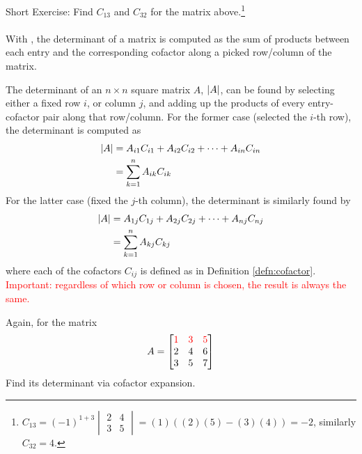 Short Exercise: Find $C_{13}$ and $C_{32}$ for the matrix above.\footnote{$C_{13} = (-1)^{1+3}\begin{vmatrix}
2 & 4 \\
3 & 5
\end{vmatrix} = (1)((2)(5)-(3)(4)) = -2$, similarly $C_{32} = 4$.}\\
\\
With , the determinant of a matrix is computed as the sum of products between each entry and the corresponding cofactor along a picked row/column of the matrix.
\begin{proper}
\label{proper:cofactorex}
The determinant of an $n \times n$ square matrix $A$, $\abs{A}$, can be found by selecting either a fixed row $i$, or column $j$, and adding up the products of every entry-cofactor pair along that row/column. For the former case (selected the $i$-th row), the determinant is computed as
\begin{subequations}
\label{eqn:cofactorexrow}
\begin{align}
\abs{A} &= A_{i1}C_{i1} + A_{i2}C_{i2} + \cdots + A_{in}C_{in} \\
&= \sum_{k=1}^{n} A_{ik}C_{ik}
\end{align}    
\end{subequations}
For the latter case (fixed the $j$-th column), the determinant is similarly found by
\begin{subequations}
\begin{align}
\abs{A} &= A_{1j}C_{1j} + A_{2j}C_{2j} + \cdots + A_{nj}C_{nj} \\
&= \sum_{k=1}^{n} A_{kj}C_{kj}
\end{align}
\end{subequations}
where each of the cofactors $C_{ij}$ is defined as in Definition \ref{defn:cofactor}. \textcolor{red}{Important: regardless of which row or column is chosen, the result is always the same.\footnotemark}
\end{proper}
\begin{exmp}
Again, for the matrix
\begin{align*}
A =
\begin{bmatrix}
\mathcolor{red}{1} & \mathcolor{red}{3} & \mathcolor{red}{5} \\
2 & 4 & 6 \\
3 & 5 & 7 
\end{bmatrix}   
\end{align*}
Find its determinant via cofactor expansion.
\end{exmp}
